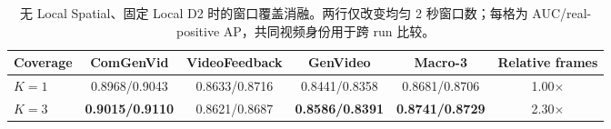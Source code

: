 \begin{table}[t]
  \centering
  \caption{无 Local Spatial、固定 Local D2 时的窗口覆盖消融。两行仅改变均匀 2 秒窗口数；每格为 AUC/real-positive AP，共同视频身份用于跨 run 比较。}
  \label{tab:window_coverage_ablation}
  {\scriptsize
  \setlength{\tabcolsep}{4.0pt}
  \renewcommand{\arraystretch}{1.10}
  \begin{tabular}{lccccc}
    \toprule
    Coverage & ComGenVid & VideoFeedback & GenVideo & Macro-3 & Relative frames \\
    \midrule
    $K=1$ & 0.8968/0.9043 & 0.8633/0.8716 & 0.8441/0.8358 & 0.8681/0.8706 & 1.00$\times$ \\
    $K=3$ & \textbf{0.9015/0.9110} & 0.8621/0.8687 & \textbf{0.8586/0.8391} & \textbf{0.8741/0.8729} & 2.30$\times$ \\
    \bottomrule
  \end{tabular}}
\end{table}
